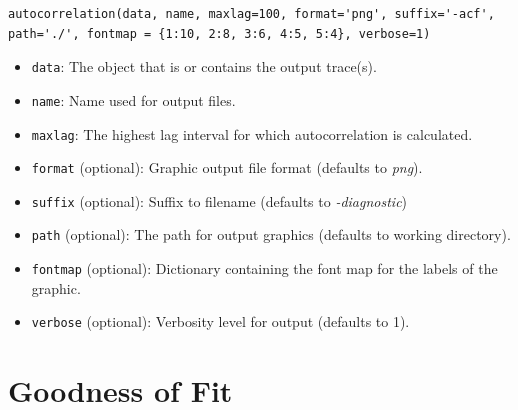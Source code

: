 \begin{verbatim}
autocorrelation(data, name, maxlag=100, format='png', suffix='-acf', path='./', fontmap = {1:10, 2:8, 3:6, 4:5, 5:4}, verbose=1)
\end{verbatim}
\begin{itemize}
	\item \verb=data=: The object that is or contains the output trace(s).

	\item \verb=name=: Name used for output files.
	
	\item \verb=maxlag=: The highest lag interval for which autocorrelation is calculated.

	\item \verb=format= (optional): Graphic output file format (defaults to \emph{png}).

	\item \verb=suffix= (optional): Suffix to filename (defaults to \emph{-diagnostic})

	\item \verb=path= (optional): The path for output graphics (defaults to working directory).

	\item \verb=fontmap= (optional): Dictionary containing the font map for the labels of the graphic.

	\item \verb=verbose= (optional): Verbosity level for output (defaults to 1).
\end{itemize}


\hypertarget{gof}{}
\section*{Goodness of Fit} %



